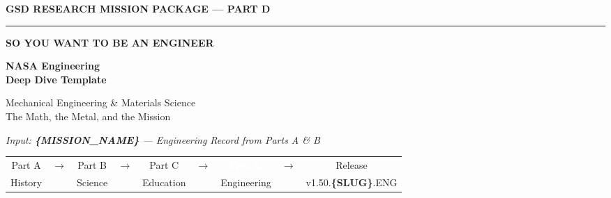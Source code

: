 \documentclass[11pt,letterpaper]{article}
\newcommand{\param}[1]{\textcolor{paramred}{\textbf{\{#1\}}}}
\begin{document}
\thispagestyle{empty}
\begin{center}
\vspace*{1.8cm}

{\small\sffamily\textcolor{primary}{\textbf{GSD RESEARCH MISSION PACKAGE --- PART D}}}

\vspace{0.3cm}
\textcolor{bordergray}{\rule{9cm}{0.4pt}}

\vspace{1cm}
{\fontsize{13}{16}\selectfont\sffamily\textcolor{secondary}{\textbf{SO YOU WANT TO BE AN ENGINEER}}}

\vspace{0.4cm}
{\fontsize{22}{28}\selectfont\bfseries\sffamily\textcolor{primary}{NASA Engineering\\[0.3em]Deep Dive Template}}

\vspace{0.6cm}
{\Large\sffamily\textcolor{tertiary}{Mechanical Engineering \& Materials Science}}\\[0.3em]
{\large\sffamily\textcolor{secondary}{The Math, the Metal, and the Mission}}

\vspace{0.4cm}
{\large\sffamily\itshape\textcolor{accent}{Input: \param{MISSION\_NAME} — Engineering Record from Parts A \& B}}

\vspace{1.6cm}
\begin{center}
\begin{tabular}{ccccccccc}
{\small\sffamily\textcolor{subtlegray}{Part A}} &
{\small\sffamily\textcolor{subtlegray}{$\to$}} &
{\small\sffamily\textcolor{subtlegray}{Part B}} &
{\small\sffamily\textcolor{subtlegray}{$\to$}} &
{\small\sffamily\textcolor{subtlegray}{Part C}} &
{\small\sffamily\textcolor{subtlegray}{$\to$}} &
\colorbox{secondary}{\textcolor{white}{\small\bfseries\sffamily\ Part D\ }} &
{\small\sffamily\textcolor{subtlegray}{$\to$}} &
{\small\sffamily\textcolor{subtlegray}{Release}}\\
{\tiny\sffamily\textcolor{subtlegray}{History}} & &
{\tiny\sffamily\textcolor{subtlegray}{Science}} & &
{\tiny\sffamily\textcolor{subtlegray}{Education}} & &
{\tiny\sffamily\textcolor{subtlegray}{Engineering}} & &
{\tiny\sffamily\textcolor{subtlegray}{v1.50.\param{SLUG}.ENG}}
\end{tabular}
\end{center}


\end{center}
\end{document}
